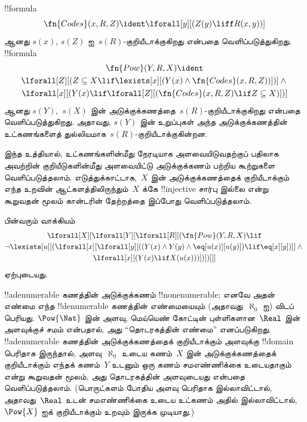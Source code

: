 \documentclass[../../../include/open-logic-section]{subfiles}
\begin{document}
\begin{prop}
!!{formula}
  \[
  \fn{Codes}(x, R, Z) \ident \lforall[y][(Z(y) \liff
    R(x, y))]
  \]
ஆனது $s(x)$, $s(Z)$ ஐ~$s(R)$-குறியீடாக்குகிறது என்பதை
வெளிப்படுத்துகிறது. !!{formula}
\begin{multline*}
  \fn{Pow}(Y, R, X) \ident \\
  \lforall[Z][(Z \subseteq X \lif \lexists[x][(Y(x) \land
    \fn{Codes}(x, R, Z))])] \land {} \\ \lforall[x][(Y(x) \lif
  \lforall[Z][(\fn{Codes}(x, R, Z) \lif Z \subseteq X)])]
\end{multline*}
ஆனது $s(Y)$,~$s(X)$ இன் அடுக்குக்கணத்தை~$s(R)$-குறியீடாக்குகிறது
என்பதை வெளிப்படுத்துகிறது. அதாவது, $s(Y)$ இன் உறுப்புகள்
அந்த அடுக்குக்கணத்தின் உட்கணங்களைத் துல்லியமாக~$s(R)$-குறியீடாக்குகின்றன.
\end{prop}

\begin{explain}
இந்த உத்தியால், உட்கணங்களின்மீது நேரடியாக அளவையிடுவதற்குப் பதிலாக
அவற்றின் குறியீடுகளின்மீது அளவையிட்டு அடுக்குக்கணம் பற்றிய கூற்றுகளை
வெளிப்படுத்தலாம். எடுத்துக்காட்டாக,~$X$ இன் அடுக்குக்கணத்தைக்
குறியீடாக்கும் எந்த உறவின் ஆட்களத்திலிருந்தும்~$X$ க்கே
!!{injective} சார்பு இல்லை என்று கூறுவதன் மூலம் கான்டரின் தேற்றத்தை
இப்போது வெளிப்படுத்தலாம்.
\end{explain}

\begin{prop}
பின்வரும் வாக்கியம்
\begin{multline*}
  \lforall[X][\lforall[Y][\lforall[R][(\fn{Pow}(Y, R, X) \lif \\
      \lnot \lexists[u][(
        \lforall[x][\lforall[y][((Y(x) \land Y(y) \land
          \eq[u(x)][u(y)]) \lif \eq[x][y])]] \land {}\\
        \lforall[x][(Y(x) \lif X(u(x)))])])]]]
\end{multline*}
ஏற்புடையது.
\end{prop}

\begin{explain}
!!a{denumerable} கணத்தின் அடுக்குக்கணம் !!{nonenumerable}; எனவே
அதன் எண்மை எந்த !!{denumerable} கணத்தின் எண்மையையும்
(அதாவது~$\aleph_0$ ஐ) விடப் பெரியது. $\Pow{\Nat}$ இன் அளவு,
மெய்யெண் கோட்டின் புள்ளிகளான~$\Real$ இன் அளவுக்குச் சமம் என்பதால்,
அது “தொடரகத்தின் எண்மை” எனப்படுகிறது. !!a{denumerable} கணத்தின்
அடுக்குக்கணத்தைக் குறியீடாக்கும் அளவுக்கு !!{domain} பெரிதாக
இருந்தால், அளவு~$\aleph_0$ உடைய கணம்~$X$ இன் அடுக்குக்கணத்தைக்
குறியீடாக்கும் எந்தக் கணம்~$Y$ உடனும் ஒரு கணம் சமஎண்ணிக்கை
உடையதாகும் என்று கூறுவதன் மூலம், அது தொடரகத்தின் அளவுடையது என்பதை
வெளிப்படுத்தலாம். (பொருட்களம் போதிய அளவு பெரிதாக இல்லாவிட்டால்,
அதாவது~$\Real$ உடன் சமஎண்ணிக்கை உடைய உட்கணம் அதில் இல்லாவிட்டால்,
~$\Pow{X}$ ஐக் குறியீடாக்கும் உறவும் இருக்க முடியாது.)
\end{explain}
\end{document}
